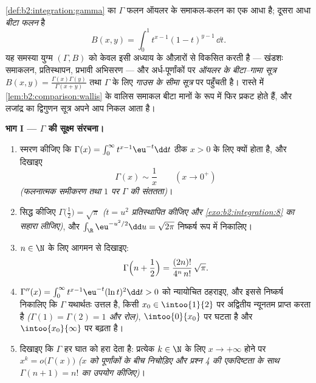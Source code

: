 \begin{problem}\label{pb:b2:integration:1}
\cref{def:b2:integration:gamma} का $\Gamma$ फलन ऑयलर के समाकल-कलन का एक आधा है; दूसरा आधा \emph{बीटा
फलन} है
\[
B(x, y) = \int_0^1 t^{x-1}(1 - t)^{y-1}\,\dd t .
\]
यह समस्या युग्म $(\Gamma, B)$ को केवल इसी अध्याय के औज़ारों से विकसित करती है ---
खंडशः समाकलन, प्रतिस्थापन, प्रभावी अभिसरण --- और अर्ध-पूर्णांकों पर
\emph{ऑयलर के बीटा--गामा सूत्र} $B(x,y) = \frac{\Gamma(x)\Gamma(y)}
{\Gamma(x+y)}$ तथा $\Gamma$ के लिए \emph{गाउस के सीमा
सूत्र} पर पहुँचती है। रास्ते में \cref{lem:b2:comparison:wallis} के वालिस
समाकल बीटा मानों के रूप में फिर प्रकट होते हैं, और लजांद्र का द्विगुणन
सूत्र अपने आप निकल आता है।

\medskip
\noindent\textbf{भाग I --- $\Gamma$ की सूक्ष्म संरचना।}
\begin{enumerate}
  \item स्मरण कीजिए कि $\Gamma(x) = \int_0^\infty t^{x-1}\eu^{-t}\dd
        t$ ठीक $x > 0$ के लिए क्यों  होता है, और
        दिखाइए
        \[
        \Gamma(x) \sim \frac1x \qquad (x \to 0^+)
        \]
        \emph{(फलनात्मक समीकरण तथा $1$ पर $\Gamma$ की संततता)}।
  \item सिद्ध कीजिए $\Gamma\bigl(\tfrac12\bigr) = \sqrt\pi$ \emph{($t = u^2$ प्रतिस्थापित कीजिए और \cref{exo:b2:integration:8} का सहारा
        लीजिए)}, और $\int_\R \eu^{-u^2/2}\dd u = \sqrt{2\pi}$ निष्कर्ष रूप में निकालिए।
  \item $n \in \N$ के लिए आगमन से दिखाइए:
        \[
        \Gamma\Bigl(n + \frac12\Bigr)
        = \frac{(2n)!}{4^n\,n!}\,\sqrt\pi .
        \]
  \item $\Gamma''(x) = \int_0^\infty
        t^{x-1}\eu^{-t}(\ln t)^2\dd t > 0$ को न्यायोचित ठहराइए, और इससे निष्कर्ष निकालिए कि $\Gamma$
        यथार्थतः उत्तल है, किसी $x_0 \in \intoo{1}{2}$ पर अद्वितीय न्यूनतम प्राप्त करता है
        \emph{($\Gamma(1) = \Gamma(2)
        = 1$ और रोल)}, $\intoo{0}{x_0}$ पर घटता है और $\intoo{x_0}{\infty}$ पर बढ़ता है।
  \item दिखाइए कि $\Gamma$ हर घात को हरा देता है: प्रत्येक $k \in
        \N$ के लिए $x \to +\infty$
        होने पर $x^k = o\bigl(\Gamma(x)\bigr)$ \emph{($x$ को पूर्णांकों के बीच निचोड़िए और प्रश्न
        4 की एकदिष्टता के साथ $\Gamma(n+1)
        = n!$ का उपयोग कीजिए)}।
\end{enumerate}


\end{problem}
